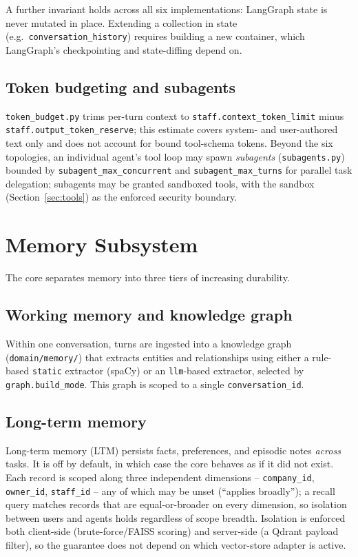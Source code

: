 \documentclass[conference]{IEEEtran}
\begin{document}
A further invariant holds across all six implementations: LangGraph state
is never mutated in place. Extending a collection in state (e.g.\
\texttt{conversation\_history}) requires building a new container, which
LangGraph's checkpointing and state-diffing depend on.

\subsection{Token budgeting and subagents}

\texttt{token\_budget.py} trims per-turn context to
\texttt{staff.context\_token\_limit} minus
\texttt{staff.output\_token\_reserve}; this estimate covers system- and
user-authored text only and does not account for bound tool-schema tokens.
Beyond the six topologies, an individual agent's tool loop may spawn
\emph{subagents} (\texttt{subagents.py}) bounded by
\texttt{subagent\_max\_concurrent} and \texttt{subagent\_max\_turns} for
parallel task delegation; subagents may be granted sandboxed tools, with
the sandbox (Section~\ref{sec:tools}) as the enforced security boundary.

\section{Memory Subsystem}
\label{sec:memory}

The core separates memory into three tiers of increasing durability.

\subsection{Working memory and knowledge graph}

Within one conversation, turns are ingested into a knowledge graph
(\texttt{domain/memory/}) that extracts entities and relationships using
either a rule-based \texttt{static} extractor (spaCy) or an
\texttt{llm}-based extractor, selected by \texttt{graph.build\_mode}. This
graph is scoped to a single \texttt{conversation\_id}.

\subsection{Long-term memory}

Long-term memory (LTM) persists facts, preferences, and episodic notes
\emph{across} tasks. It is off by default, in which case the core
behaves as if it did not exist. Each record is scoped along three
independent dimensions -- \texttt{company\_id}, \texttt{owner\_id},
\texttt{staff\_id} -- any of which may be unset (``applies broadly''); a
recall query matches records that are equal-or-broader on every
dimension, so isolation between users and agents holds regardless of
scope breadth. Isolation is enforced both client-side (brute-force/FAISS
scoring) and server-side (a Qdrant payload filter), so the guarantee does
not depend on which vector-store adapter is active.
\end{document}
